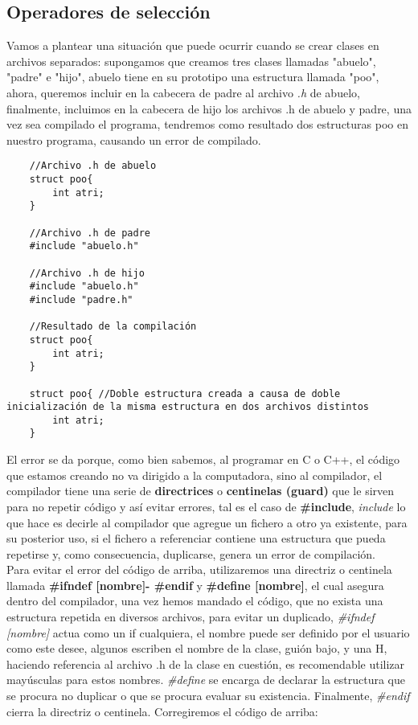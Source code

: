 \subsection{Operadores de selección}
Vamos a plantear una situación que puede ocurrir cuando se crear clases en archivos separados: supongamos que creamos tres clases llamadas "abuelo", "padre" e "hijo", abuelo tiene en su prototipo una estructura llamada "poo", ahora, queremos incluir en la cabecera de padre al archivo \textit{.h} de abuelo, finalmente, incluimos en la cabecera de hijo los archivos .h de abuelo y padre, una vez sea compilado el programa, tendremos como resultado dos estructuras poo en nuestro programa, causando un error de compilado.
\begin{lstlisting}
    //Archivo .h de abuelo
    struct poo{
        int atri;
    }
    
    //Archivo .h de padre
    #include "abuelo.h"
    
    //Archivo .h de hijo
    #include "abuelo.h"
    #include "padre.h"
    
    //Resultado de la compilación
    struct poo{
        int atri;
    }
    
    struct poo{ //Doble estructura creada a causa de doble inicialización de la misma estructura en dos archivos distintos
        int atri;
    }
\end{lstlisting}
El error se da porque, como bien sabemos, al programar en C o C++, el código que estamos creando no va dirigido a la computadora, sino al compilador, el compilador tiene una serie de \textbf{directrices} o \textbf{centinelas (guard)} que le sirven para no repetir código y así evitar errores, tal es el caso de \textbf{\#include}, \textit{include} lo que hace es decirle al compilador que agregue un fichero a otro ya existente, para su posterior uso, si el fichero a referenciar contiene una estructura que pueda repetirse y, como consecuencia, duplicarse, genera un error de compilación.\\
Para evitar el error del código de arriba, utilizaremos una directriz o centinela llamada \textbf{\#ifndef [nombre]- \#endif} y \textbf{\#define [nombre]}, el cual asegura dentro del compilador, una vez hemos mandado el código, que no exista una estructura repetida en diversos archivos, para evitar un duplicado, \textit{\#ifndef [nombre]} actua como un if cualquiera, el nombre puede ser definido por el usuario como este desee, algunos escriben el nombre de la clase, guión bajo, y una H, haciendo referencia al archivo .h de la clase en cuestión, es recomendable utilizar mayúsculas para estos nombres. \textit{\#define} se encarga de declarar la estructura que se procura no duplicar o que se procura evaluar su existencia. Finalmente, \textit{\#endif} cierra la directriz o centinela. Corregiremos el código de arriba:
